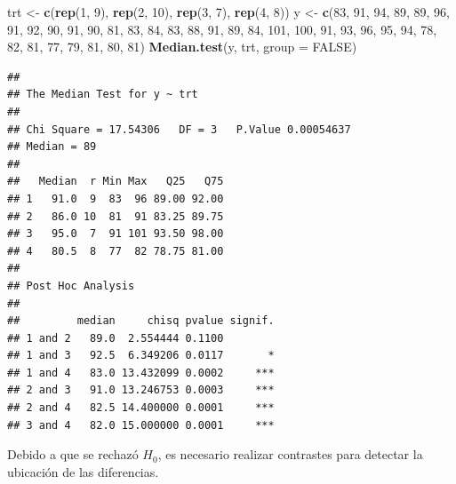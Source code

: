 \documentclass[]{book}
\newenvironment{Shaded}{\begin{snugshade}}{\end{snugshade}}
\newcommand{\DataTypeTok}[1]{\textcolor[rgb]{0.13,0.29,0.53}{#1}}
\newcommand{\DecValTok}[1]{\textcolor[rgb]{0.00,0.00,0.81}{#1}}
\newcommand{\KeywordTok}[1]{\textcolor[rgb]{0.13,0.29,0.53}{\textbf{#1}}}
\newcommand{\NormalTok}[1]{#1}
\newcommand{\OtherTok}[1]{\textcolor[rgb]{0.56,0.35,0.01}{#1}}
\newcommand{\StringTok}[1]{\textcolor[rgb]{0.31,0.60,0.02}{#1}}
\theoremstyle{definition}
\theoremstyle{definition}
\theoremstyle{definition}
\theoremstyle{remark}
\begin{document}
\begin{Shaded}
\begin{Highlighting}[]
\NormalTok{trt <-}\StringTok{ }\KeywordTok{c}\NormalTok{(}\KeywordTok{rep}\NormalTok{(}\DecValTok{1}\NormalTok{, }\DecValTok{9}\NormalTok{), }\KeywordTok{rep}\NormalTok{(}\DecValTok{2}\NormalTok{, }\DecValTok{10}\NormalTok{), }\KeywordTok{rep}\NormalTok{(}\DecValTok{3}\NormalTok{, }\DecValTok{7}\NormalTok{), }\KeywordTok{rep}\NormalTok{(}\DecValTok{4}\NormalTok{, }\DecValTok{8}\NormalTok{))}
\NormalTok{y <-}\StringTok{ }\KeywordTok{c}\NormalTok{(}\DecValTok{83}\NormalTok{, }\DecValTok{91}\NormalTok{, }\DecValTok{94}\NormalTok{, }\DecValTok{89}\NormalTok{, }\DecValTok{89}\NormalTok{, }\DecValTok{96}\NormalTok{, }\DecValTok{91}\NormalTok{, }\DecValTok{92}\NormalTok{, }\DecValTok{90}\NormalTok{, }\DecValTok{91}\NormalTok{, }\DecValTok{90}\NormalTok{, }\DecValTok{81}\NormalTok{, }\DecValTok{83}\NormalTok{, }\DecValTok{84}\NormalTok{, }\DecValTok{83}\NormalTok{, }\DecValTok{88}\NormalTok{, }\DecValTok{91}\NormalTok{, }\DecValTok{89}\NormalTok{, }
       \DecValTok{84}\NormalTok{, }\DecValTok{101}\NormalTok{, }\DecValTok{100}\NormalTok{, }\DecValTok{91}\NormalTok{, }\DecValTok{93}\NormalTok{, }\DecValTok{96}\NormalTok{, }\DecValTok{95}\NormalTok{, }\DecValTok{94}\NormalTok{, }\DecValTok{78}\NormalTok{, }\DecValTok{82}\NormalTok{, }\DecValTok{81}\NormalTok{, }\DecValTok{77}\NormalTok{, }\DecValTok{79}\NormalTok{, }\DecValTok{81}\NormalTok{, }\DecValTok{80}\NormalTok{, }\DecValTok{81}\NormalTok{)}
\KeywordTok{Median.test}\NormalTok{(y, trt, }\DataTypeTok{group =} \OtherTok{FALSE}\NormalTok{)}
\end{Highlighting}
\end{Shaded}

\begin{verbatim}
## 
## The Median Test for y ~ trt 
## 
## Chi Square = 17.54306   DF = 3   P.Value 0.00054637
## Median = 89 
## 
##   Median  r Min Max   Q25   Q75
## 1   91.0  9  83  96 89.00 92.00
## 2   86.0 10  81  91 83.25 89.75
## 3   95.0  7  91 101 93.50 98.00
## 4   80.5  8  77  82 78.75 81.00
## 
## Post Hoc Analysis
## 
##         median     chisq pvalue signif.
## 1 and 2   89.0  2.554444 0.1100        
## 1 and 3   92.5  6.349206 0.0117       *
## 1 and 4   83.0 13.432099 0.0002     ***
## 2 and 3   91.0 13.246753 0.0003     ***
## 2 and 4   82.5 14.400000 0.0001     ***
## 3 and 4   82.0 15.000000 0.0001     ***
\end{verbatim}

Debido a que se rechazó \(H_{0}\), es necesario realizar contrastes para
detectar la ubicación de las diferencias.
\end{document}
